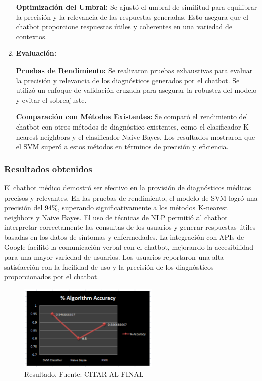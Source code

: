 \begin{enumerate}
		\subitem \textbf{Optimización del Umbral:} Se ajustó el umbral de similitud para equilibrar la precisión y la relevancia de las respuestas generadas. Esto asegura que el chatbot proporcione respuestas útiles y coherentes en una variedad de contextos.
			
	\item \textbf{Evaluación:}
	
		\subitem \textbf{Pruebas de Rendimiento:} Se realizaron pruebas exhaustivas para evaluar la precisión y relevancia de los diagnósticos generados por el chatbot. Se utilizó un enfoque de validación cruzada para asegurar la robustez del modelo y evitar el sobreajuste.
	
		\subitem \textbf{Comparación con Métodos Existentes:} Se comparó el rendimiento del chatbot con otros métodos de diagnóstico existentes, como el clasificador K-nearest neighbors y el clasificador Naive Bayes. Los resultados mostraron que el SVM superó a estos métodos en términos de precisión y eficiencia.
	
\end{enumerate}

\subsubsection{Resultados obtenidos}

	El chatbot médico demostró ser efectivo en la provisión de diagnósticos médicos precisos y relevantes. En las pruebas de rendimiento, el modelo de SVM logró una precisión del 94\%, superando significativamente a los métodos K-nearest neighbors y Naive Bayes. El uso de técnicas de NLP permitió al chatbot interpretar correctamente las consultas de los usuarios y generar respuestas útiles basadas en los datos de síntomas y enfermedades. La integración con APIs de Google facilitó la comunicación verbal con el chatbot, mejorando la accesibilidad para una mayor variedad de usuarios. Los usuarios reportaron una alta satisfacción con la facilidad de uso y la precisión de los diagnósticos proporcionados por el chatbot.
	
\begin{figure}[h]
	\begin{center}
		\includegraphics[width=0.6\textwidth]{2/1_antecedentes/Resultado2-10.png}
		\caption{Resultado. Fuente: CITAR AL FINAL }
	\end{center}
\end{figure}